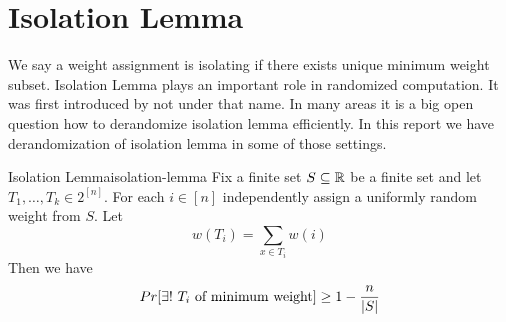 \chapter{Isolation Lemma}
We say a weight assignment is isolating if there exists unique minimum weight subset. Isolation Lemma plays an important role in randomized computation. It was first introduced by \cite{ValiantVazirani_1986_Nia} not under that name. In many areas it is a big open question how to derandomize isolation lemma efficiently. In this report we have derandomization of isolation lemma in some of those settings. 
\begin{theorem}{Isolation Lemma}{isolation-lemma}
    Fix a finite set $S\subseteq \mathbb{R}$ be a finite set and let $T_1,\dots, T_k\in 2^{[n]}$. For each $i\in [n]$ independently assign a uniformly random weight from $S$.  Let $$w(T_i)=\sum_{x\in T_i}w(i)$$Then we have $$Pr[\exists!\ \text{$T_i$ of minimum weight}]\geq 1-\frac{n}{|S|}$$
\end{theorem}

